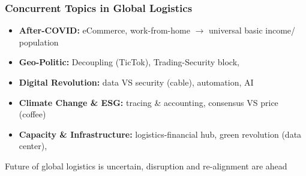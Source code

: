 \documentclass[10pt,presentation]{beamer}
\begin{document}
\begin{frame}
  \frametitle{Concurrent Topics in Global Logistics}

  \begin{itemize}
    \item \textbf{After-COVID:} eCommerce, work-from-home $\rightarrow$ universal basic income/ population
    \item \textbf{Geo-Politic:} Decoupling (TicTok), Trading-Security block,
    \item \textbf{Digital Revolution:} data VS security (cable), automation, AI
    \item \textbf{Climate Change \& ESG:} tracing \& accounting, consensus \textsc{VS} price (coffee)
    \item \textbf{Capacity \& Infrastructure:} logistics-financial hub, green revolution (data center),
  \end{itemize}

  \NextLine
  \begin{block}{}{}
    Future of global logistics is uncertain, \alert{disruption} and \alert{re-alignment} are ahead
  \end{block}


\end{frame}



\end{document}
